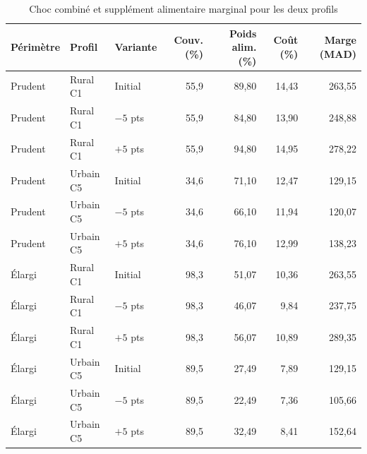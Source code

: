\begin{table}[!htbp]
\centering\small
\setlength{\tabcolsep}{4pt}
\caption{Choc combiné et supplément alimentaire marginal pour les deux profils}\label{tab:robustesse-choc}
\begin{tabular}{lllrrrr}
\hline
Périmètre & Profil & Variante & Couv. (\%) & Poids alim. (\%) & Coût (\%) & Marge (MAD) \\
\hline
Prudent & Rural C1 & Initial & 55{,}9 & 89{,}80 & 14{,}43 & 263{,}55 \\
Prudent & Rural C1 & $-5$ pts & 55{,}9 & 84{,}80 & 13{,}90 & 248{,}88 \\
Prudent & Rural C1 & $+5$ pts & 55{,}9 & 94{,}80 & 14{,}95 & 278{,}22 \\
Prudent & Urbain C5 & Initial & 34{,}6 & 71{,}10 & 12{,}47 & 129{,}15 \\
Prudent & Urbain C5 & $-5$ pts & 34{,}6 & 66{,}10 & 11{,}94 & 120{,}07 \\
Prudent & Urbain C5 & $+5$ pts & 34{,}6 & 76{,}10 & 12{,}99 & 138{,}23 \\
\hline
Élargi & Rural C1 & Initial & 98{,}3 & 51{,}07 & 10{,}36 & 263{,}55 \\
Élargi & Rural C1 & $-5$ pts & 98{,}3 & 46{,}07 & 9{,}84 & 237{,}75 \\
Élargi & Rural C1 & $+5$ pts & 98{,}3 & 56{,}07 & 10{,}89 & 289{,}35 \\
Élargi & Urbain C5 & Initial & 89{,}5 & 27{,}49 & 7{,}89 & 129{,}15 \\
Élargi & Urbain C5 & $-5$ pts & 89{,}5 & 22{,}49 & 7{,}36 & 105{,}66 \\
Élargi & Urbain C5 & $+5$ pts & 89{,}5 & 32{,}49 & 8{,}41 & 152{,}64 \\
\hline
\end{tabular}
\end{table}
